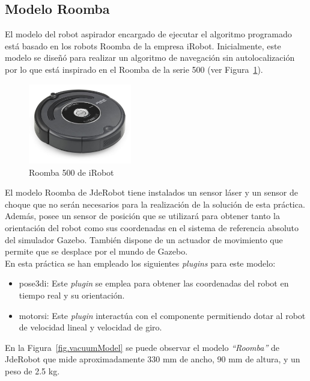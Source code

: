 \subsection{Modelo Roomba}
El modelo del robot aspirador encargado de ejecutar el algoritmo programado está basado en los robots Roomba de la empresa iRobot. Inicialmente, este modelo se diseñó para realizar un algoritmo de navegación sin autolocalización por lo que está inspirado en el Roomba de la serie 500 (ver Figura~\ref{fig.roomba500}). 

\begin{figure}[H]
  \begin{center}
    \includegraphics[width=0.4\textwidth]{figures/Vacuum/roomba500.jpg}
		\caption{Roomba 500 de iRobot}
		\label{fig.roomba500}
		\end{center}
\end{figure}

El modelo Roomba de JdeRobot tiene instalados un sensor láser y un sensor de choque que no serán necesarios para la realización de la solución de esta práctica. Además, posee un sensor de posición que se utilizará para obtener tanto la orientación del robot como sus coordenadas en el sistema de referencia absoluto del simulador Gazebo. También dispone de un actuador de movimiento que permite que se desplace por el mundo de Gazebo. \\

En esta práctica se han empleado los siguientes \textit{plugins} para este modelo:

\begin{itemize}
\item pose3di: Este \textit{plugin} se emplea para obtener las coordenadas del robot en tiempo real y su orientación.
\item motorsi: Este \textit{plugin} interactúa con el componente permitiendo dotar al robot de velocidad lineal y velocidad de giro.
\end{itemize}

En la Figura~\ref{fig.vacuumModel} se puede observar el modelo \textit{``Roomba''} de JdeRobot que mide aproximadamente 330 mm de ancho, 90 mm de altura, y un peso de 2.5 kg.\\

